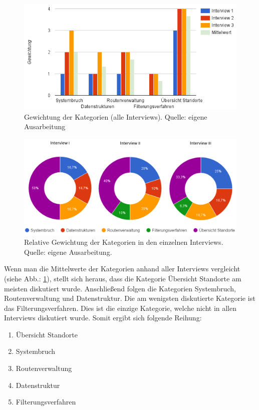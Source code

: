 \documentclass[Bachelorarbeit.tex]{subfiles}
\begin{document}
\begin{figure}[H]
	\centering
	\includegraphics[width=0.9\linewidth]{img/Interviews/KategorienGesamt}
	\caption[Gewichtung der Kategorien (alle Interviews)]{Gewichtung der Kategorien (alle Interviews). Quelle: eigene Ausarbeitung}
	\label{fig:KategorienGesamt}
\end{figure}

\begin{figure}[H]
	\centering
	\includegraphics[width=0.9\linewidth]{img/Interviews/VerteilungNachInterview}
	\caption[Relative Gewichtung der Kategorien in den einzelnen Interviews]{Relative Gewichtung der Kategorien in den einzelnen Interviews. Quelle: eigene Ausarbeitung.}
	\label{fig:GewichtungNachInterview}
\end{figure}
\newpage
Wenn man die Mittelwerte der Kategorien anhand aller Interviews vergleicht (siehe Abb.: \ref{fig:KategorienGesamt}), stellt sich heraus, dass die Kategorie Übersicht Standorte am meisten diskutiert wurde. 
Anschließend folgen die Kategorien Systembruch, Routenverwaltung und Datenstruktur.
Die am wenigsten diskutierte Kategorie ist das Filterungsverfahren. 
Dies ist die einzige Kategorie, welche nicht in allen Interviews diskutiert wurde.
Somit ergibt sich folgende Reihung:
\begin{enumerate}
	\item Übersicht Standorte
	\item Systembruch
	\item Routenverwaltung
	\item Datenstruktur
	\item Filterungsverfahren
\end{enumerate}
\end{document}
